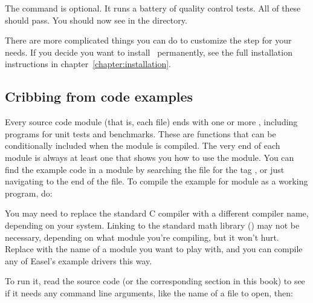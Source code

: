 \begin{cchunk}
\end{cchunk}

The  command is optional. It runs a battery of
quality control tests. All of these should pass. You should now see
 in the directory.

There are more complicated things you can do to customize the
 step for your needs. If you decide you want to
install \Easel\ permanently, see the full installation instructions in
chapter~\ref{chapter:installation}.

\subsection{Cribbing from code examples}

Every source code module (that is, each  file) ends with one
or more , including programs for unit tests
and benchmarks. These are  functions that can be
conditionally included when the module is compiled. The very end of
each module is always at least one  that shows
you how to use the module. You can find the example code in a module
 by searching the  file for the tag
, or just navigating to the end of the file. To
compile the example for module  as a working program, do:

\begin{cchunk}
\end{cchunk}

You may need to replace the standard C compiler  with a
different compiler name, depending on your system. Linking to the
standard math library () may not be necessary, depending on
what module you're compiling, but it won't hurt. Replace 
with the name of a module you want to play with, and you can compile
any of Easel's example drivers this way.

To run it, read the source code (or the corresponding section in this
book) to see if it needs any command line arguments, like the name of
a file to open, then:

\begin{cchunk}
\end{cchunk}

